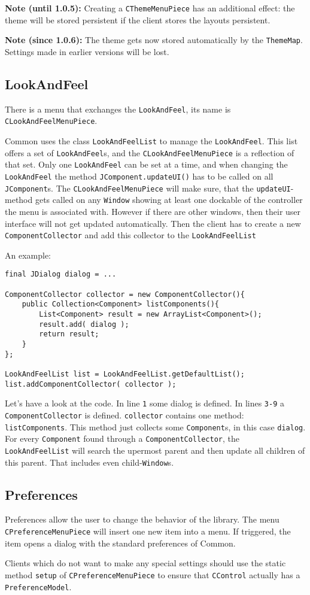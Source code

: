 \documentclass[a4paper,10pt]{article}
\newcommand{\src}[1]{\lstinline[basicstyle=\ttfamily]|#1|}
\newcommand{\until}[1]{\textbf{Note (until #1): }}
\newcommand{\since}[1]{\textbf{Note (since #1): }}
\begin{document}
\until{1.0.5} Creating a \src{CThemeMenuPiece} has an additional effect: the theme will be stored persistent if the client stores the layouts persistent.

\since{1.0.6} The theme gets now stored automatically by the \src{ThemeMap}. Settings made in earlier versions will be lost.

\subsection{LookAndFeel}
There is a menu that exchanges the \src{LookAndFeel}, its name is \\\src{CLookAndFeelMenuPiece}.

Common uses the class \src{LookAndFeelList} to manage the \src{LookAndFeel}. This list offers a set of \src{LookAndFeel}s, and the \src{CLookAndFeelMenuPiece} is a reflection of that set. Only one \src{LookAndFeel} can be set at a time, and when changing the \src{LookAndFeel} the method \src{JComponent.updateUI()} has to be called on all \src{JComponent}s. The \src{CLookAndFeelMenuPiece} will make sure, that the \src{updateUI}-method gets called on any \src{Window} showing at least one dockable of the controller the menu is associated with. However if there are other windows, then their user interface will not get updated automatically. Then the client has to create a new \src{ComponentCollector} and add this collector to the \src{LookAndFeelList}

An example:
\begin{lstlisting}
final JDialog dialog = ...

ComponentCollector collector = new ComponentCollector(){
	public Collection<Component> listComponents(){
		List<Component> result = new ArrayList<Component>();
		result.add( dialog );
		return result;
	}
};

LookAndFeelList list = LookAndFeelList.getDefaultList();
list.addComponentCollector( collector );
\end{lstlisting}
Let's have a look at the code. In line \src{1} some dialog is defined. In lines \src{3-9} a \src{ComponentCollector} is defined. \src{collector} contains one method: \\\src{listComponents}. This method just collects some \src{Component}s, in this case \src{dialog}. For every \src{Component} found through a \src{ComponentCollector}, the \\\src{LookAndFeelList} will search the upermost parent and then update all children of this parent. That includes even child-\src{Window}s.

\subsection{Preferences}
Preferences allow the user to change the behavior of the library. The menu \src{CPreferenceMenuPiece} will insert one new item into a menu. If triggered, the item opens a dialog with the standard preferences of Common.

Clients which do not want to make any special settings should use the static method \src{setup} of \src{CPreferenceMenuPiece} to ensure that \src{CControl} actually has a \src{PreferenceModel}.
\end{document}
